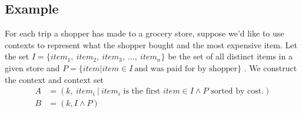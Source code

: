 \subsection{Example}
\begin{example}
    For each trip a shopper has made to a grocery store, suppose we'd like to use contexts to represent what the shopper bought and the most expensive item.
    Let the set $I = \{ item_{1},\:item_{2},\:item_{3},\:\dots,\:item_{n}\}$ be the set of all distinct items in a given store and $P = \{item | item \in I \:\text{and was paid for by shopper}\}$ . We construct the context and context set
    \begin{align}
        A & = (k,\:item_{i}\:|\:\text{$item_{i}$ is the first $item \in I \land P$ sorted by cost.}) \\
        B & = (k, I \land P)
    \end{align}
\end{example}